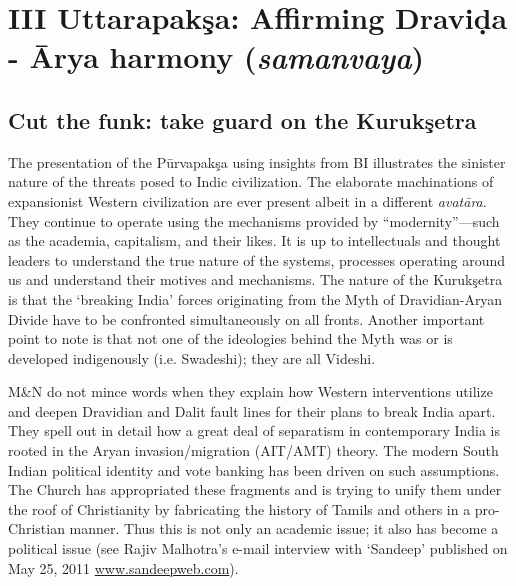 \section*{III Uttarapakşa: Affirming Draviḍa - Ārya harmony (\textit{samanvaya})}

\subsection*{Cut the funk: take guard on the Kurukşetra}

The presentation of the Pūrvapakşa using insights from BI illustrates the sinister nature of the threats posed to Indic civilization. The elaborate machinations of expansionist Western civilization are ever present albeit in a different \textit{avatāra}. They continue to operate using the mechanisms provided by “modernity”—such as the academia, capitalism, and their likes. It is up to intellectuals and thought leaders to understand the true nature of the systems, processes operating around us and understand their motives and mechanisms. The nature of the Kurukşetra is that the ‘breaking India’ forces originating from the Myth of Dravidian-Aryan Divide have to be confronted simultaneously on all fronts. Another important point to note is that not one of the ideologies behind the Myth was or is developed indigenously (i.e. Swadeshi); they are all Videshi.

M\&N do not mince words when they explain how Western interventions utilize and deepen Dravidian and Dalit fault lines for their plans to break India apart. They spell out in detail how a great deal of separatism in contemporary India is rooted in the Aryan invasion/migra\-tion (AIT/AMT) theory. The modern South Indian political identity and vote banking has been driven on such assumptions. The Church has appropriated these fragments and is trying to unify them under the roof of Christianity by fabricating the history of Tamils and others in a pro-Christian manner. Thus this is not only an academic issue; it also has become a political issue (see Rajiv Malhotra’s e-mail interview with ‘Sandeep’ published on May 25, 2011 \url{www.sandeepweb.com}).

